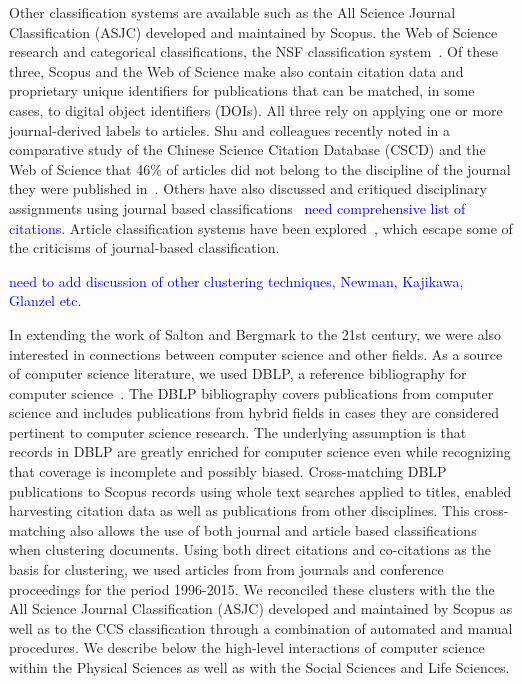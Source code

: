 Other classification systems are available such as the All Science Journal Classification (ASJC) developed and maintained by Scopus. the Web of Science research and categorical classifications, the NSF classification system~\cite{nsf_classification}. Of these three, Scopus and the Web of Science make also contain citation data and proprietary unique identifiers for publications that can be matched, in some cases, to digital object identifiers (DOIs). All three rely on applying one or more journal-derived labels to articles. Shu and colleagues recently noted in a comparative study of the Chinese Science Citation Database (CSCD) and the Web of Science that 46\% of articles did not belong to the discipline of the journal they were published in~\cite{shu_comparing_2019}. Others have also discussed and critiqued disciplinary assignments using journal based classifications~\cite{wang_large-scale_2016} \textcolor{blue}{need comprehensive list of citations}. Article classification systems have been explored~\cite{traag_louvain_2019,boyack_classification_2014,waltman_new_2012}, which escape some of the criticisms of journal-based classification.
 
 \textcolor{blue}{need to add discussion of other clustering techniques, Newman, Kajikawa, Glanzel etc.}
 
In extending the work of Salton and Bergmark to the 21st century, we were also interested in connections between computer science and other fields. As a source of computer science literature, we used DBLP, a reference bibliography for computer science~\cite{dblp_ref}. The DBLP bibliography covers publications from computer science and includes publications from hybrid fields in cases they are considered pertinent to computer science research. The underlying assumption is that records in DBLP are greatly enriched for computer science even while recognizing that coverage is incomplete and possibly biased. Cross-matching DBLP publications to Scopus records using whole text searches applied to titles, enabled harvesting citation data as well as publications from other disciplines. This cross-matching also allows the use of both journal and article based classifications when clustering documents. Using both direct citations and co-citations as the basis for clustering, we used articles from from journals and conference proceedings for the period 1996-2015. We reconciled these clusters with the the All Science Journal Classification (ASJC) developed and maintained by Scopus as well as to the CCS classification through a combination of automated and manual procedures. We describe below the high-level interactions of computer science within the Physical Sciences as well as with the Social Sciences and Life Sciences. 


